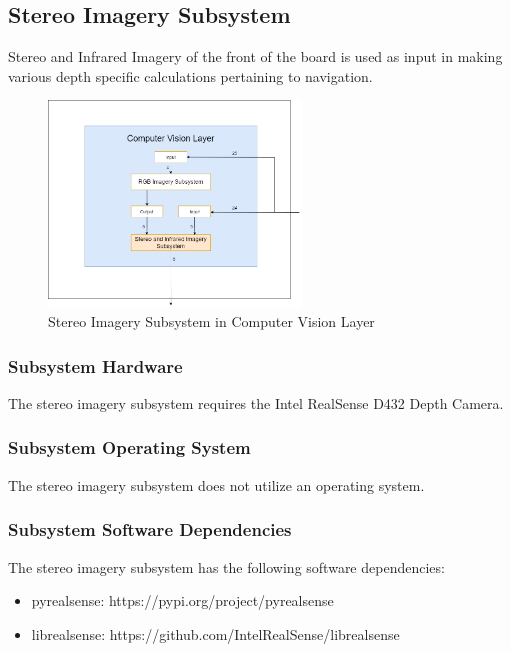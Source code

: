 \pagebreak

\subsection{Stereo Imagery Subsystem}
Stereo and Infrared Imagery of the front of the board is used as input in making various depth specific calculations pertaining to navigation.

\begin{figure}[h!]
	\centering
 	\includegraphics[width=0.60\textwidth]{images/CV_SIR.png} %
 \caption{Stereo Imagery Subsystem in Computer Vision Layer} %
\end{figure}


\subsubsection{Subsystem Hardware}
The stereo imagery subsystem requires the Intel RealSense D432 Depth Camera.

\subsubsection{Subsystem Operating System}
The stereo imagery subsystem does not utilize an operating system.

\subsubsection{Subsystem Software Dependencies}
The stereo imagery subsystem has the following software dependencies:
\begin{itemize}
    \item pyrealsense: https://pypi.org/project/pyrealsense
    \item librealsense: https://github.com/IntelRealSense/librealsense 
\end{itemize}

